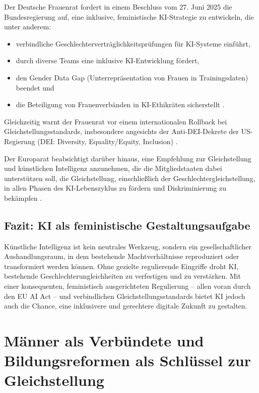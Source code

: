 \documentclass[12pt,a4paper]{article}
\begin{document}
	Der Deutsche Frauenrat fordert in einem Beschluss vom 27. Juni 2025 die Bundesregierung auf, eine inklusive, feministische KI-Strategie zu entwickeln, die unter anderem:
	\begin{itemize}
		\item verbindliche Geschlechterverträglichkeitsprüfungen für KI-Systeme einführt,
		\item durch diverse Teams eine inklusive KI-Entwicklung fördert,
		\item den Gender Data Gap (Unterrepräsentation von Frauen in Trainingsdaten) beendet und
		\item die Beteiligung von Frauenverbänden in KI-Ethikräten sicherstellt \cite{eu_ai_act_frauenrat}.
	\end{itemize}
	
	Gleichzeitig warnt der Frauenrat vor einem internationalen Rollback bei Gleichstellungsstandards, insbesondere angesichts der Anti-DEI-Dekrete der US-Regierung (DEI: Diversity, Equality/Equity, Inclusion) \cite{eu_ai_act_frauenrat}.
	
	Der Europarat beabsichtigt darüber hinaus, eine Empfehlung zur Gleichstellung und künstlichen Intelligenz anzunehmen, die die Mitgliedstaaten dabei unterstützen soll, die Gleichstellung, einschließlich der Geschlechtergleichstellung, in allen Phasen des KI-Lebenszyklus zu fördern und Diskriminierung zu bekämpfen \cite{europarat_empfehlung_ki}.
	
	\subsection{Fazit: KI als feministische Gestaltungsaufgabe}
	
	Künstliche Intelligenz ist kein neutrales Werkzeug, sondern ein gesellschaftlicher Aushandlungsraum, in dem bestehende Machtverhältnisse reproduziert oder transformiert werden können. Ohne gezielte regulierende Eingriffe droht KI, bestehende Geschlechterungleichheiten zu verfestigen und zu verstärken. Mit einer konsequenten, feministisch ausgerichteten Regulierung – allen voran durch den EU AI Act – und verbindlichen Gleichstellungsstandards bietet KI jedoch auch die Chance, eine inklusivere und gerechtere digitale Zukunft zu gestalten.
	
	\section{Männer als Verbündete und Bildungsreformen als Schlüssel zur Gleichstellung}
	
\end{document}
